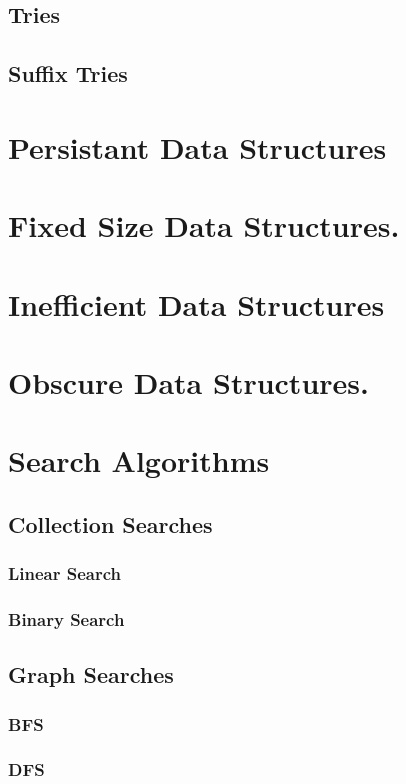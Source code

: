 \documentclass[12pt, letterpaper]{book}
\begin{document}
\chapter{Tries}
\chapter{Suffix Tries}

\part{Persistant Data Structures}

\part{Fixed Size Data Structures.}

\part{Inefficient Data Structures}

\part{Obscure Data Structures.}

\part{Search Algorithms}

	\chapter{Collection Searches}
		\section{Linear Search} \label{linear search}
		\section{Binary Search} \label{binary search}

	\chapter{Graph Searches}
		\section{BFS}
		\section{DFS}
\end{document}
